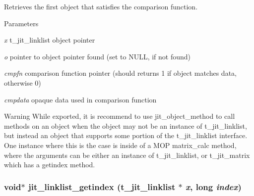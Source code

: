 Retrieves the first object that satisfies the comparison function. 
\begin{DoxyParams}{Parameters}
\item[{\em x}]t\_\-jit\_\-linklist object pointer \item[{\em o}]pointer to object pointer found (set to NULL, if not found) \item[{\em cmpfn}]comparison function pointer (should returns 1 if object matches data, otherwise 0) \item[{\em cmpdata}]opaque data used in comparison function\end{DoxyParams}
\begin{DoxyWarning}{Warning}
While exported, it is recommend to use jit\_\-object\_\-method to call methods on an object when the object may not be an instance of t\_\-jit\_\-linklist, but instead an object that supports some portion of the t\_\-jit\_\-linklist interface. One instance where this is the case is inside of a MOP matrix\_\-calc method, where the arguments can be either an instance of t\_\-jit\_\-linklist, or t\_\-jit\_\-matrix which has a getindex method. 
\end{DoxyWarning}
\hypertarget{group__linklistmod_ga727e60be2a2ff3426661dbac83119599}{
\subsubsection[{jit\_\-linklist\_\-getindex}]{\setlength{\rightskip}{0pt plus 5cm}void$\ast$ jit\_\-linklist\_\-getindex (t\_\-jit\_\-linklist $\ast$ {\em x}, \/  long {\em index})}}
\label{group__linklistmod_ga727e60be2a2ff3426661dbac83119599}


